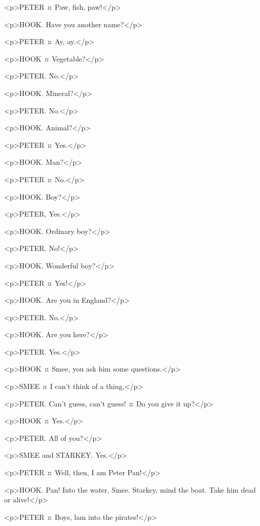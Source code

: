<p>PETER ¤
Paw, fish, paw!</p>


<p>HOOK. Have you another name?</p>

<p>PETER ¤
Ay, ay.</p>

<p>HOOK ¤
Vegetable?</p>

<p>PETER. No.</p>

<p>HOOK. Mineral?</p>

<p>PETER. No.</p>

<p>HOOK. Animal?</p>

<p>PETER ¤
Yes.</p>

<p>HOOK. Man?</p>

<p>PETER ¤
No.</p>

<p>HOOK. Boy?</p>

<p>PETER, Yes.</p>

<p>HOOK. Ordinary boy?</p>

<p>PETER. No!</p>

<p>HOOK. Wonderful boy?</p>

<p>PETER ¤
Yes!</p>

<p>HOOK. Are you in England?</p>

<p>PETER. No.</p>

<p>HOOK. Are you here?</p>

<p>PETER. Yes.</p>

<p>HOOK ¤
Smee, you ask him some questions.</p>

<p>SMEE ¤
I can't think of a thing,</p>

<p>PETER. Can't guess, can't guess!
¤
Do you give it up?</p>

<p>HOOK ¤
Yes.</p>

<p>PETER. All of you?</p>

<p>SMEE and STARKEY. Yes.</p>

<p>PETER ¤
Well, then, I am Peter Pan!</p>


<p>HOOK. Pan! Into the water, Smee. Starkey, mind the boat. Take him dead or alive!</p>

<p>PETER ¤
Boys, lam into the pirates!</p>

